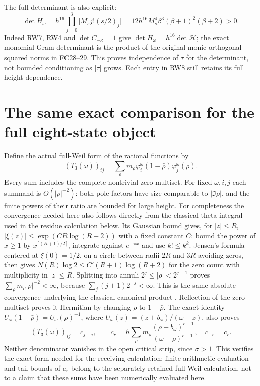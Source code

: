 \documentclass[11pt]{article}
\begin{document}
The full determinant is also explicit:
\[
 \det H_\omega
 =h^{16}\prod_{j=0}^3\bigl[M_s j!(s/2)_j\bigr]
 =12h^{16}M_s^4\beta^3(\beta+1)^2(\beta+2)>0.
 \tag{RW11}
\]
Indeed RW7, RW4 and $\det C_{-\kappa}=1$ give
$\det H_\omega=h^{16}\det\mathcal H$; the exact monomial
Gram determinant is the product of the original monic
orthogonal squared norms in FC28--29. This proves independence
of $\tau$ for the determinant, not bounded conditioning as
$|\tau|$ grows. Each entry in RW8 still retains its full height
dependence.

\section{The same exact comparison for the full eight-state object}
Define the actual full-Weil form of the rational functions by
\[
 (T_3(\omega))_{ij}
 =\sum_{\rho}m_\rho\overline{\varphi_i^\omega(1-\bar\rho)}
                                     \varphi_j^\omega(\rho).
 \tag{RW12}
\]
Every sum includes the complete nontrivial zero multiset.
For fixed $\omega,i,j$ each summand is $O(|\rho|^{-2})$:
both pole factors have size comparable to $|\Im\rho|$, and
the finite powers of their ratio are bounded for large height.
For completeness the convergence needed here also follows
directly from the classical theta integral used in the residue
calculation below. Its Gaussian bound gives, for $|z|\le R$,
$|\xi(z)|\le\exp(CR\log(R+2))$ with a fixed constant $C$:
bound the power of $x\ge1$ by $x^{\lceil(R+1)/2\rceil}$,
integrate against $e^{-\pi x}$ and use $k!\le k^k$.
Jensen's formula centered at $\xi(0)=1/2$, on a circle between
radii $2R$ and $3R$ avoiding zeros, then gives
$N(R)\log2\le C'(R+1)\log(R+2)$ for the zero count with
multiplicity in $|z|\le R$. Splitting into annuli
$2^j\le|\rho|<2^{j+1}$ proves
$\sum_\rho m_\rho|\rho|^{-2}<\infty$, because
$\sum_j(j+1)2^{-j}<\infty$. This is the same absolute
convergence underlying the classical canonical product
\cite[25.2.12]{DLMFXi}. Reflection of the zero multiset
proves it Hermitian by changing $\rho$ to $1-\bar\rho$.
The exact identity
$\overline{U_\omega(1-\bar\rho)}=U_\omega(\rho)^{-1}$,
where $U_\omega(z)=(z+b_\omega)/(\omega-z)$, also proves
\[
 (T_3(\omega))_{ij}=c_{j-i},\qquad
 c_r=h\sum_\rho m_\rho
       \frac{(\rho+b_\omega)^{r-1}}{(\omega-\rho)^{r+1}},
 \quad c_{-r}=\bar c_r.
 \tag{RW13}
\]
Neither denominator vanishes in the open critical strip, since
$\sigma>1$. This verifies the exact form needed for the
receiving calculation; finite arithmetic evaluation and tail
bounds of $c_r$ belong to the separately retained full-Weil
calculation, not to a claim that these sums have been numerically
evaluated here.
\end{document}
